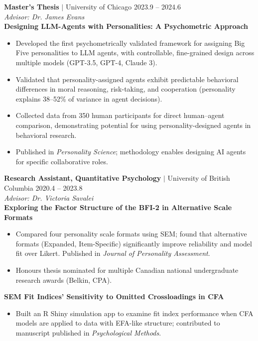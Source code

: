 \documentclass[11pt,letterpaper]{article}
\newcommand{\project}[1]{\textbf{\textcolor{black!80}{#1}}}
\newcommand{\advisor}[1]{\textit{Advisor: #1}}
\begin{document}
\vspace{0.5em}

\noindent\textbf{Master's Thesis} $|$ University of Chicago \hfill 2023.9 -- 2024.6\\
\noindent\advisor{Dr. James Evans}\\[0.3em]
\noindent\project{Designing LLM-Agents with Personalities: A Psychometric Approach}
\begin{itemize}
    \item Developed the first psychometrically validated framework for assigning Big Five personalities to LLM agents, with controllable, fine-grained design across multiple models (GPT-3.5, GPT-4, Claude 3).
    \item Validated that personality-assigned agents exhibit predictable behavioral differences in moral reasoning, risk-taking, and cooperation (personality explains 38--52\% of variance in agent decisions).
    \item Collected data from 350 human participants for direct human--agent comparison, demonstrating potential for using personality-designed agents in behavioral research.
    \item Published in \textit{Personality Science}; methodology enables designing AI agents for specific collaborative roles.
\end{itemize}

\vspace{0.5em}

\noindent\textbf{Research Assistant, Quantitative Psychology} $|$ University of British Columbia \hfill 2020.4 -- 2023.8\\
\noindent\advisor{Dr. Victoria Savalei}\\[0.3em]
\noindent\project{Exploring the Factor Structure of the BFI-2 in Alternative Scale Formats}
\begin{itemize}
    \item Compared four personality scale formats using SEM; found that alternative formats (Expanded, Item-Specific) significantly improve reliability and model fit over Likert. Published in \textit{Journal of Personality Assessment}.
    \item Honours thesis nominated for multiple Canadian national undergraduate research awards (Belkin, CPA).
\end{itemize}
\noindent\project{SEM Fit Indices' Sensitivity to Omitted Crossloadings in CFA}
\begin{itemize}
    \item Built an R Shiny simulation app to examine fit index performance when CFA models are applied to data with EFA-like structure; contributed to manuscript published in \textit{Psychological Methods}.
\end{itemize}
\end{document}

